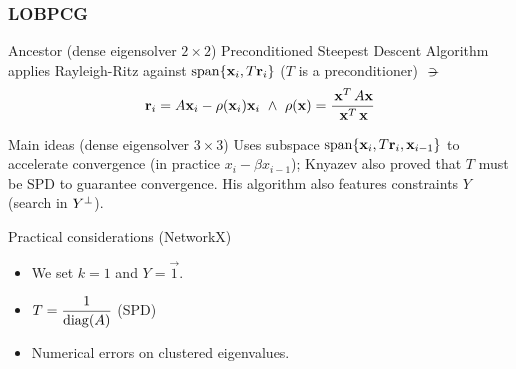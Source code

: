  \begin{frame}
  \frametitle{LOBPCG}
  \begin{block}{Ancestor (dense eigensolver $2 \times 2$)}
    Preconditioned Steepest Descent Algorithm applies Rayleigh-Ritz
    against $\operatorname{span} \{\mathbf{x}_i, T\mathbf{r}_i\}$
    ($T$ is a preconditioner) $\suchthat$
    \[
    \joinabove{0}
    \vec{r}_i = A\vec{x}_i - \func{\rho}(\vec{x}_i)\vec{x}_i
    \ds{\land}
    \func{\rho}(\vec{x}) = \dfrac{\trans{\vec{x}}A\vec{x}}{\trans{\vec{x}}\vec{x}}
    \joinbelow{0}
    \]
  \end{block}
  \begin{block}{Main ideas (dense eigensolver $3 \times 3$)}
    Uses subspace $\operatorname{span} \{\mathbf{x}_i, T\mathbf{r}_i, \mathbf{x}_{i-1}\}$ to
    accelerate convergence (in practice $x_{i} - \beta x_{i-1}$); Knyazev also
    proved that $T$ must be SPD to guarantee convergence. His algorithm also features constraints $Y$ (search in ${Y}^{\bot}$).
  \end{block}
  \begin{block}{Practical considerations (NetworkX)}
    \begin{itemize}
    \item We set $k=1$ and $Y = \vec{1}$.
    \item $T = \dfrac{1}{\operatorname{diag}(A)}$ (SPD)
    \item Numerical errors on clustered eigenvalues.
    \end{itemize}
  \end{block}
\end{frame}

